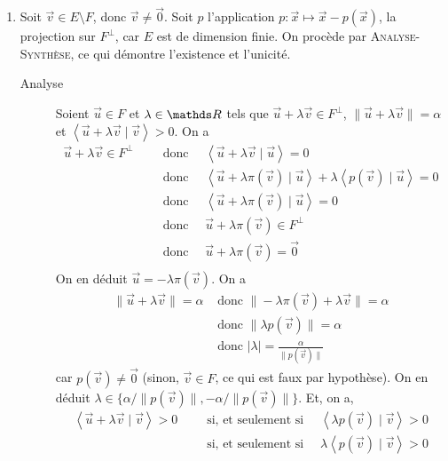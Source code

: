 \documentclass[a4paper]{article}
\begin{document}
	\begin{enumerate}
		\item Soit $\vec{v} \in E \setminus F$, donc $\vec{v} \neq \vec{0}$.
			Soit $p$\/ l'application $p : \vec{x} \mapsto \vec{x} - p(\vec{x})$, la projection sur $F^\perp$, car $E$\/ est de dimension finie.
			On procède par \textsc{Analyse-Synthèse}, ce qui démontre l'existence et l'unicité.
			\begin{description}
				\item[Analyse] Soient $\vec{u} \in F$\/ et $\lambda \in \R$\/ tels que $\vec{u} + \lambda \vec{v} \in F^\perp$, $\|\vec{u} + \lambda \vec{v}\| = \alpha$\/ et $\left<\vec{u} + \lambda \vec{v}  \mid \vec{v} \right> > 0$. On a
					\begin{align*}
						\vec{u} + \lambda \vec{v} \in F^\perp \quad~&\text{ donc }\quad \left<\vec{u} + \lambda \vec{v}  \mid \vec{u} \right> = 0\\
						& \text{ donc }\quad \left<\vec{u} + \lambda\pi(\vec{v}) \mid \vec{u} \right> + \lambda \left<p(\vec{v})  \mid \vec{u} \right> = 0\\
						&\text{ donc }\quad \left<\vec{u} + \lambda \pi(\vec{v})  \mid \vec{u} \right> = 0\\
						& \text{ donc }\quad \vec{u} + \lambda \pi(\vec{v}) \in F^\perp\\
						& \text{ donc }\quad \vec{u} + \lambda \pi(\vec{v}) = \vec{0}\\
					\end{align*}
					On en déduit $\vec{u} = -\lambda \pi(\vec{v})$.
					On a
					\begin{align*}
						\|\vec{u} + \lambda \vec{v}\| = \alpha &\text{ donc } \|-\lambda \pi(\vec{v}) + \lambda \vec{v}\| = \alpha\\
						&\text{ donc } \|\lambda p(\vec{v})\| = \alpha\\
						& \text{ donc } |\lambda| = \frac{\alpha}{\|p(\vec{v})\|}
					\end{align*}
					car $p(\vec{v}) \neq \vec{0}$ (sinon, $\vec{v} \in F$, ce qui est faux par hypothèse).
					On en déduit $\lambda \in \{\alpha/\|p(\vec{v})\|, -\alpha/\|p(\vec{v})\|\}$.
					Et, on a,
					\begin{align*}
						\left<\vec{u} + \lambda \vec{v}  \mid \vec{v} \right> > 0 \quad~& \text{ si, et seulement si } \quad
						\left< \lambda p(\vec{v})  \mid \vec{v}\right> > 0\\
						&\text{ si, et seulement si }\quad \lambda \left<p(\vec{v}) \mid \vec{v} \right> > 0\\

\end{align*}
\end{description}
\end{enumerate}
\end{document}
